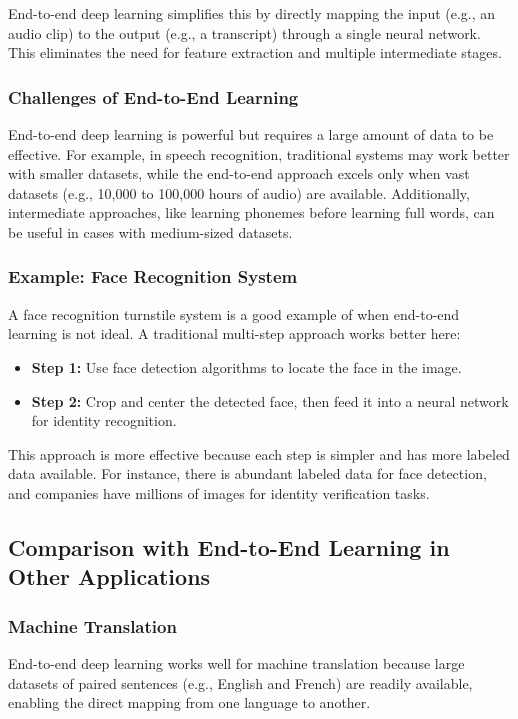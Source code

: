 \documentclass[letterpaper,12pt,notitlepage,twoside]{report}
\begin{document}
End-to-end deep learning simplifies this by directly mapping the input (e.g., an audio clip) to the output (e.g., a transcript) through a single neural network. This eliminates the need for feature extraction and multiple intermediate stages.

\subsubsection*{Challenges of End-to-End Learning}
End-to-end deep learning is powerful but requires a large amount of data to be effective. For example, in speech recognition, traditional systems may work better with smaller datasets, while the end-to-end approach excels only when vast datasets (e.g., 10,000 to 100,000 hours of audio) are available. Additionally, intermediate approaches, like learning phonemes before learning full words, can be useful in cases with medium-sized datasets.

\subsubsection*{Example: Face Recognition System}
A face recognition turnstile system is a good example of when end-to-end learning is not ideal. A traditional multi-step approach works better here:
\begin{itemize}[nosep]
    \item \textbf{Step 1:} Use face detection algorithms to locate the face in the image.
    \item \textbf{Step 2:} Crop and center the detected face, then feed it into a neural network for identity recognition.
\end{itemize}

This approach is more effective because each step is simpler and has more labeled data available. For instance, there is abundant labeled data for face detection, and companies have millions of images for identity verification tasks.

\subsection*{Comparison with End-to-End Learning in Other Applications}
\subsubsection{Machine Translation}
End-to-end deep learning works well for machine translation because large datasets of paired sentences (e.g., English and French) are readily available, enabling the direct mapping from one language to another.
\end{document}
